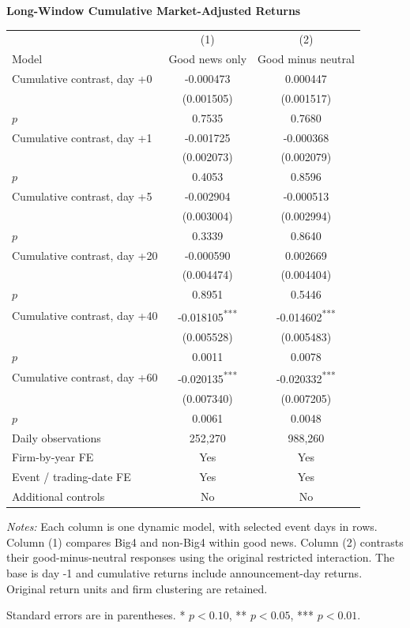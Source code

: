 \documentclass[10pt]{article}
\newcommand{\sym}[1]{\textsuperscript{#1}}
\begin{document}
\begin{minipage}{18.00cm}
\fontsize{10}{12}\selectfont
\setlength{\tabcolsep}{4pt}\renewcommand{\arraystretch}{1.08}
{\large\bfseries Long-Window Cumulative Market-Adjusted Returns}\par\medskip
\begin{tabular*}{\linewidth}{@{\extracolsep{\fill}}lcc@{}}
\toprule
 & (1) & (2) \\
Model & Good news only & Good minus neutral \\
\midrule
Cumulative contrast, day +0 & -0.000473 & 0.000447 \\
 & (0.001505) & (0.001517) \\
$p$ & 0.7535 & 0.7680 \\
Cumulative contrast, day +1 & -0.001725 & -0.000368 \\
 & (0.002073) & (0.002079) \\
$p$ & 0.4053 & 0.8596 \\
Cumulative contrast, day +5 & -0.002904 & -0.000513 \\
 & (0.003004) & (0.002994) \\
$p$ & 0.3339 & 0.8640 \\
Cumulative contrast, day +20 & -0.000590 & 0.002669 \\
 & (0.004474) & (0.004404) \\
$p$ & 0.8951 & 0.5446 \\
Cumulative contrast, day +40 & -0.018105\sym{***} & -0.014602\sym{***} \\
 & (0.005528) & (0.005483) \\
$p$ & 0.0011 & 0.0078 \\
Cumulative contrast, day +60 & -0.020135\sym{***} & -0.020332\sym{***} \\
 & (0.007340) & (0.007205) \\
$p$ & 0.0061 & 0.0048 \\
\midrule
Daily observations & 252,270 & 988,260 \\
Firm-by-year FE & Yes & Yes \\
Event / trading-date FE & Yes & Yes \\
Additional controls & No & No \\
\bottomrule\end{tabular*}\par\medskip
\fontsize{9}{11}\selectfont\textit{Notes:} Each column is one dynamic model, with selected event days in rows. Column (1) compares Big4 and non-Big4 within good news. Column (2) contrasts their good-minus-neutral responses using the original restricted interaction. The base is day -1 and cumulative returns include announcement-day returns. Original return units and firm clustering are retained.
\par Standard errors are in parentheses. * $p<0.10$, ** $p<0.05$, *** $p<0.01$.
\end{minipage}
\end{document}
